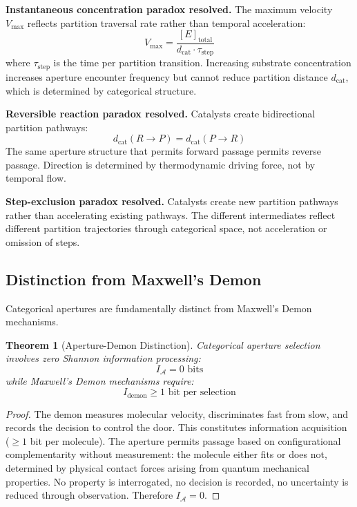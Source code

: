 \documentclass[twocolumn,10pt,a4paper]{article}
\newtheorem{theorem}{Theorem}[section]
\theoremstyle{definition}
\theoremstyle{remark}
\newcommand{\aperture}{\mathcal{A}}
\newcommand{\dcat}{d_{\mathrm{cat}}}
\begin{document}
\textbf{Instantaneous concentration paradox resolved.} The maximum velocity $V_{\max}$ reflects partition traversal rate rather than temporal acceleration:
\begin{equation}
V_{\max} = \frac{[E]_{\mathrm{total}}}{\dcat \cdot \tau_{\mathrm{step}}}
\end{equation}
where $\tau_{\mathrm{step}}$ is the time per partition transition. Increasing substrate concentration increases aperture encounter frequency but cannot reduce partition distance $\dcat$, which is determined by categorical structure.

\textbf{Reversible reaction paradox resolved.} Catalysts create bidirectional partition pathways:
\begin{equation}
\dcat(R \to P) = \dcat(P \to R)
\end{equation}
The same aperture structure that permits forward passage permits reverse passage. Direction is determined by thermodynamic driving force, not by temporal flow.

\textbf{Step-exclusion paradox resolved.} Catalysts create new partition pathways rather than accelerating existing pathways. The different intermediates reflect different partition trajectories through categorical space, not acceleration or omission of steps.

\subsection{Distinction from Maxwell's Demon}

Categorical apertures are fundamentally distinct from Maxwell's Demon mechanisms.

\begin{theorem}[Aperture-Demon Distinction]
\label{thm:aperture_demon}
Categorical aperture selection involves zero Shannon information processing:
\begin{equation}
I_{\aperture} = 0 \text{ bits}
\end{equation}
while Maxwell's Demon mechanisms require:
\begin{equation}
I_{\mathrm{demon}} \geq 1 \text{ bit per selection}
\end{equation}
\end{theorem}

\begin{proof}
The demon measures molecular velocity, discriminates fast from slow, and records the decision to control the door. This constitutes information acquisition ($\geq 1$ bit per molecule). The aperture permits passage based on configurational complementarity without measurement: the molecule either fits or does not, determined by physical contact forces arising from quantum mechanical properties. No property is interrogated, no decision is recorded, no uncertainty is reduced through observation. Therefore $I_{\aperture} = 0$.
\end{proof}
\end{document}

